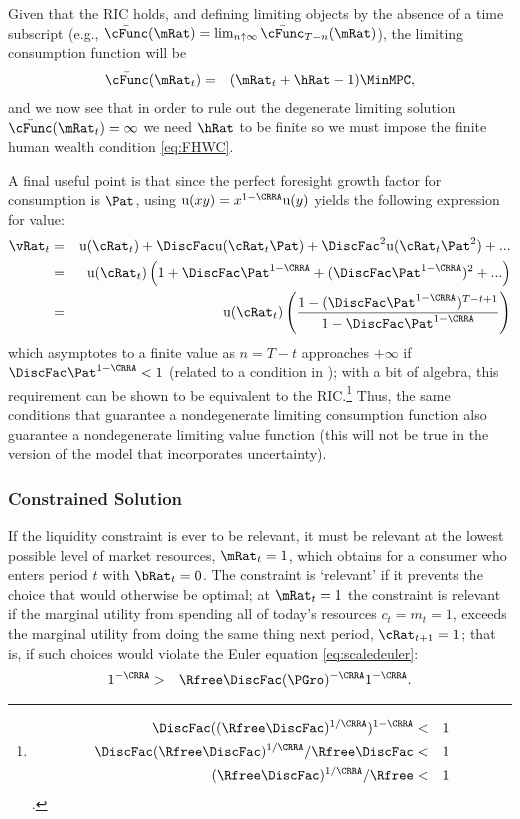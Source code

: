 \documentclass[titlepage]{\econtex}\providecommand{\texname}{BufferStockTheory}%
\begin{document}
Given that the RIC holds, and defining limiting objects by the absence of a time subscript (e.g., $\bar{\cFunc}(\mRat)=\lim_{n \uparrow \infty} \bar{\cFunc}_{T-n}(\mRat)$), the limiting consumption function will be
\begin{eqnarray}
  \bar{\cFunc}(\mRat_{t}) & = & (\mRat_{t}+\hRat-1)\MinMPC, \label{eq:cFuncPFUnc}
\end{eqnarray}
and we now see that in order to rule out the degenerate limiting
solution $\bar{\cFunc}(\mRat_{t}) = \infty$ we need $\hRat$ to be finite so we
must impose the finite human wealth condition \eqref{eq:FHWC}.

A final useful point is that since the perfect foresight
growth factor for consumption is $\Pat$, using $\util(xy) =
x^{1-\CRRA}\util(y)$ yields the following expression for value:
\begin{eqnarray*}
  \vRat_{t} & = & \util(\cRat_{t})+\DiscFac \util(\cRat_{t}\Pat)+\DiscFac^{2} \util(\cRat_{t} \Pat^{2})+...
\\ & = & \util(\cRat_{t})\left(1+\DiscFac \Pat^{1-\CRRA}+(\DiscFac \Pat^{1-\CRRA})^{2}+...\right)
\\ & = & \util(\cRat_{t})\left(\frac{1-(\DiscFac \Pat^{1-\CRRA})^{T-t+1}}{1-\DiscFac \Pat^{1-\CRRA}}\right)
\end{eqnarray*}
which asymptotes to a finite value as $n=T-t$ approaches $+\infty$ if $\DiscFac \Pat^{1-\CRRA} < 1$ (related to a condition in \cite{asHomogeneous}); with a bit of algebra, this requirement can be shown to be equivalent to the RIC.\footnote{
\begin{eqnarray*}
   \DiscFac ((\Rfree \DiscFac)^{1/\CRRA})^{1-\CRRA} & < & 1
\\ \DiscFac (\Rfree\DiscFac)^{1/\CRRA}/\Rfree\DiscFac & < & 1
\\ (\Rfree \DiscFac)^{1/\CRRA} /\Rfree & < & 1
\end{eqnarray*}.
}  Thus, the same conditions that guarantee a nondegenerate limiting consumption function also guarantee a nondegenerate limiting value function (this will not be true in the version of the model that incorporates uncertainty).


\subsubsection{Constrained Solution}

If the liquidity constraint is ever to be relevant, it must be
relevant at the lowest possible level of market resources,
$\mRat_{t}=1$, which obtains for a consumer who enters period $t$ with
$\bRat_{t}=0$.  The constraint is `relevant' if
it prevents the choice that would otherwise be optimal; at
$\mRat_{t}=1$ the constraint is relevant if the marginal utility from spending all of today's
resources $c_{t}=m_{t}=1$, exceeds the marginal utility from
doing the same thing next period, $\cRat_{t+1}=1$; that is, if such
choices would violate the Euler equation \eqref{eq:scaledeuler}:
\begin{eqnarray}
    1^{-\CRRA} & > & \Rfree \DiscFac (\PGro)^{-\CRRA}1^{-\CRRA}  \label{eq:LiqConstrBinds}.
\end{eqnarray}
\end{document}

